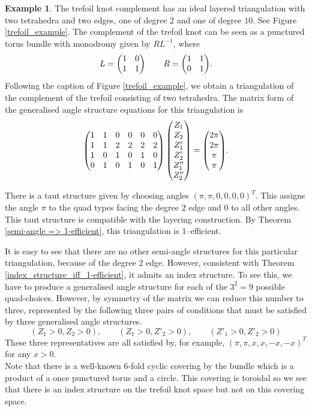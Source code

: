 \documentclass[12pt]{amsart}
\theoremstyle{definition}
\newtheorem{ex}[thm]{Example}
\theoremstyle{remark}
\begin{document}
\begin{ex}
The trefoil knot complement has an ideal layered triangulation with two tetrahedra and two edges, one of degree $2$ and one of degree $10$. See Figure \ref{trefoil_example}. The complement of the trefoil knot can be seen as a punctured torus bundle with monodromy given by $RL^{-1}$, where 
\[
L=\begin{pmatrix}1&0\\1&1\end{pmatrix} \qquad R=\begin{pmatrix}1&1\\0&1\end{pmatrix}\negthinspace .
\]
Following the caption of Figure \ref{trefoil_example}, we obtain a triangulation of the complement of the trefoil consisting of two tetrahedra. The matrix form of the generalised angle structure equations for this triangulation is
\[
\begin{pmatrix} 
1&1&0&0&0&0\\
1&1&2&2&2&2\\
1&0&1&0&1&0\\
0&1&0&1&0&1
\end{pmatrix} 
\begin{pmatrix}
Z_1 \\ Z_2 \\ Z'_1 \\ Z'_2\\ Z''_1 \\ Z''_2
\end{pmatrix}
=
\begin{pmatrix}
2\pi \\ 2\pi \\ \pi \\ \pi
\end{pmatrix}  \negthinspace.
\]

There is a taut structure given by choosing angles $(\pi, \pi,0,0,0,0)^T$. This assigns the angle $\pi$ to the quad types facing the degree $2$ edge and $0$ to all other angles. This taut structure is compatible with the layering construction. By Theorem \ref{semi-angle => 1-efficient}, this triangulation is 1--efficient. 

It is easy to see that there are no other semi-angle structures for this particular triangulation, because of the degree 2 edge. However, consistent with Theorem \ref{index_structure_iff_1-efficient}, it admits an index structure. To see this, we have to produce a generalised angle structure for each of the $3^2=9$ possible quad-choices. However, by symmetry of the matrix we can reduce this number to three, represented by the following three pairs of conditions that must be satisfied by three generalised angle structures.
\[
(Z_1 > 0, Z_2>0), \qquad (Z_1 > 0, Z'_2>0),  \qquad (Z'_1 > 0, Z'_2>0)
\]
These three representatives are all satisfied by, for example, $(\pi,\pi,x,x,-x,-x)^T$ for any $x>0$.\\

Note that there is a well-known 6-fold cyclic covering 
by the bundle which is a product of a once punctured torus and a circle. This covering is toroidal so we see that there is an index structure on the trefoil knot space but not on this covering space. 
\end{ex}
\end{document}
